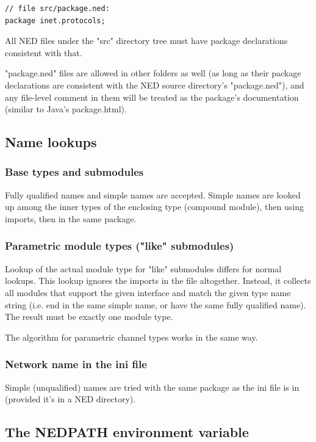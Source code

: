 \begin{Verbatim}[commandchars=\\\{\}]
// file src/package.ned:
package inet.protocols;
\end{Verbatim}

All NED files under the "src" directory tree must have package
declarations consistent with that.

"package.ned" files are allowed in other folders as well (as long as
their package declarations are consistent with the NED source
directory's "package.ned"), and any file-level comment in them
will be treated as the package's documentation (similar to Java's
package.html).


\subsection{Name lookups}

\subsubsection{Base types and submodules}

Fully qualified names and simple names are accepted. Simple names
are looked up among the inner types of the enclosing type (compound
module), then using imports, then in the same package.


\subsubsection{Parametric module types ("like" submodules)}

Lookup of the actual module type for "like" submodules differs for normal
lookups. This lookup ignores the imports in the file altogether.
Instead, it collects all modules that support the given interface
and match the given type name string (i.e. end in the same simple name,
or have the same fully qualified name). The result must be exactly
one module type.

The algorithm for parametric channel types works in the same way.


\subsubsection{Network name in the ini file}

Simple (unqualified) names are tried with the same package as the
ini file is in (provided it's in a NED directory).

\subsection{The NEDPATH environment variable}

